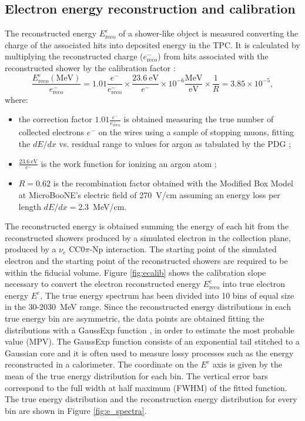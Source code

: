 \subsection{Electron energy reconstruction and calibration}\label{sec:showerenergy}
The reconstructed energy $E_{\mathrm{reco}}^{e}$ of a shower-like object is measured converting the charge of the associated hits into deposited energy in the TPC. It is calculated by multiplying the reconstructed charge ($e^{-}_{\mathrm{reco}}$) from hits associated with the reconstructed shower by the calibration factor \cite{Acciarri:2017sjy}:
\begin{equation}
\frac{E_{\mathrm{reco}}^{e} \mathrm{(MeV)}}{e^{-}_{\mathrm{reco}}} = 1.01\frac{e^-}{e^{-}_{\mathrm{reco}}} \times \frac{23.6~\mathrm{eV}}{e^-} \times 10^{-6} \frac{\mathrm{MeV}}{\mathrm{eV}} \times \frac{1}{R} = 3.85\times10^{-5},\label{eq:calib}
\end{equation}
where:
\begin{itemize}

\item the correction factor $1.01\frac{e^-}{e^{-}_{\mathrm{reco}}}$ is obtained measuring the true number of collected electrons $e^{-}$ on the wires using a sample of stopping muons, fitting the $dE/dx$ vs. residual range to values for argon as tabulated by the PDG \cite{PhysRevD.98.030001};
\item $\frac{23.6~\mathrm{eV}}{e^-}$ is the work function for ionizing an argon atom \cite{Shibamura:1975zz};
\item $R = 0.62$ is the recombination factor obtained with the Modified Box Model \cite{Acciarri:2013met} at MicroBooNE's electric field of 270~V/cm assuming an energy loss per length $dE/dx=2.3$~MeV/cm.
\end{itemize}

The reconstructed energy is obtained summing the energy of each hit from the reconstructed showers produced by a simulated electron in the collection plane, produced by a $\nu_{e}$ CC0$\pi$-Np interaction. The starting point of the simulated electron and the starting point of the reconstructed showers are required to be within the fiducial volume. 
Figure \ref{fig:ecalib} shows the calibration slope necessary to convert the electron reconstructed energy $E_{\mathrm{reco}}^{e}$ into true electron energy $E^{e}$. The true energy spectrum has been divided into 10 bins of equal size in the 30-2030~MeV range. Since the reconstructed energy distributions in each true energy bin are asymmetric, the data points are obtained fitting the distributions with a GaussExp function \cite{Das:2016stf}, in order to estimate the most probable value (MPV). The GaussExp function consists of an exponential tail stitched to a Gaussian core and it is often used to measure lossy processes such as the energy reconstructed in a calorimeter. The coordinate on the $E^{e}$ axis is given by the mean of the true energy distribution for each bin. The vertical error bars correspond to the full width at half maximum (FWHM) of the fitted function. The true energy distribution and the reconstruction energy distribution for every bin are shown in Figure \ref{fig:e_spectra}.

